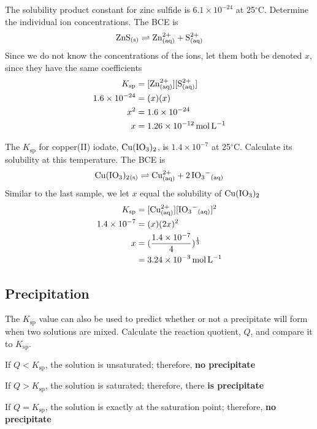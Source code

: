 \begin{sample}{The solubility product constant for zinc sulfide is $6.1\times10^{-24}$ at 25$^{\circ}$C.
    Determine the individual ion concentrations.}
    The BCE is
    \[
        \ch{ZnS_{(s)}}\rightleftharpoons \ch{Zn^{2+}_{(aq)}}+\ch{S^{2+}_{(aq)}}
    \]
    Since we do not know the concentrations of the ions, let them both be denoted $x$, since they
    have the same coefficients
    \begin{align*}
        K_\mathrm{sp}&=[\ch{Zn^{2+}_{(aq)}}][\ch{S^{2+}_{(aq)}}]\\
        1.6\times10^{-24}&=(x)(x)\\
        x^2&=1.6\times10^{-24}\\
        x&=1.26\times10^{-12}\,\si{mol.L^{-1}}
    \end{align*}
\end{sample}

\begin{sample}{The $K_\mathrm{sp}$ for copper(II) iodate, $\ch{Cu(IO3)2}$, is $1.4\times10^{-7}$
    at 25$^{\circ}$C. Calculate its solubility at this temperature.}
    The BCE is 
    \[
        \ch{Cu(IO3)2_{(s)}}\rightleftharpoons \ch{Cu^{2+}_{(aq)}}+\ch{2IO3^-_{(aq)}}
    \]
    Similar to the last sample, we let $x$ equal the solubility of $\ch{Cu(IO3)2}$
    \begin{align*}
        K_\mathrm{sp}&=[\ch{Cu^{2+}_{(aq)}}][\ch{IO3^-_{(aq)}}]^2\\
        1.4\times10^{-7}&=(x)(2x)^2\\
        x&=(\frac{1.4\times10^{-7}}{4})^\frac{1}{3}\\
         &=3.24\times10^{-3}\,\si{mol.L^{-1}}
    \end{align*}
\end{sample}

\subsection{Precipitation}
The $K_\mathrm{sp}$ value can also be used to predict whether or not a precipitate will form when
two solutions are mixed. Calculate the reaction quotient, $Q$, and compare it to $K_\mathrm{sp}$.
\begin{bulleted-list}
    \item If $Q<K_\mathrm{sp}$, the solution is unsaturated; therefore, \textbf{no precipitate}
    \item If $Q>K_\mathrm{sp}$, the solution is saturated; therefore, there \textbf{is precipitate}
    \item If $Q=K_\mathrm{sp}$, the solution is exactly at the saturation point; therefore, \textbf{no precipitate}
\end{bulleted-list}

